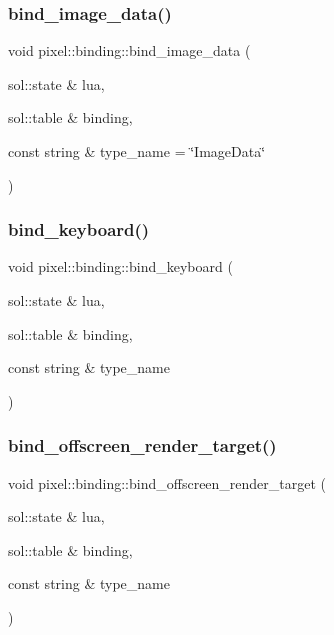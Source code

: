 \mbox{\label{namespacepixel_1_1binding_ab1d6b8f35766477a2a49cdb658f8e799}} 
\subsubsection{\texorpdfstring{bind\+\_\+image\+\_\+data()}{bind\_image\_data()}}
{\footnotesize\ttfamily void pixel\+::binding\+::bind\+\_\+image\+\_\+data (\begin{DoxyParamCaption}\item[{sol\+::state \&}]{lua,  }\item[{sol\+::table \&}]{binding,  }\item[{const string \&}]{type\+\_\+name = {\ttfamily \char`\"{}ImageData\char`\"{}} }\end{DoxyParamCaption})}

\mbox{\label{namespacepixel_1_1binding_a8710271205036eb70d213b0a81b9ce48}} 
\subsubsection{\texorpdfstring{bind\+\_\+keyboard()}{bind\_keyboard()}}
{\footnotesize\ttfamily void pixel\+::binding\+::bind\+\_\+keyboard (\begin{DoxyParamCaption}\item[{sol\+::state \&}]{lua,  }\item[{sol\+::table \&}]{binding,  }\item[{const string \&}]{type\+\_\+name }\end{DoxyParamCaption})}

\mbox{\label{namespacepixel_1_1binding_a9486ccd069276d9bdc7b4efda484c020}} 
\subsubsection{\texorpdfstring{bind\+\_\+offscreen\+\_\+render\+\_\+target()}{bind\_offscreen\_render\_target()}}
{\footnotesize\ttfamily void pixel\+::binding\+::bind\+\_\+offscreen\+\_\+render\+\_\+target (\begin{DoxyParamCaption}\item[{sol\+::state \&}]{lua,  }\item[{sol\+::table \&}]{binding,  }\item[{const string \&}]{type\+\_\+name }\end{DoxyParamCaption})}

